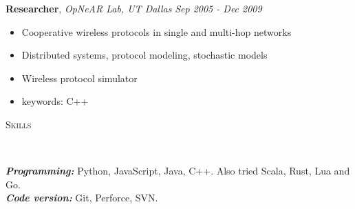 \documentclass[9pt]{article}
\newenvironment{changemargin}[2]{%
  \begin{list}{}{%
    \setlength{\topsep}{0pt}%
    \setlength{\leftmargin}{#1}%
    \setlength{\rightmargin}{#2}%
    \setlength{\listparindent}{\parindent}%
    \setlength{\itemindent}{\parindent}%
    \setlength{\parsep}{\parskip}%
  }%
  \item[]}{\end{list}
}
\newcommand{\lineover}{
	\begin{changemargin}{-0.05in}{-0.05in}
		\vspace*{-8pt}
		\hrulefill \\
		\vspace*{-2pt}
	\end{changemargin}
}
\newcommand{\header}[1]{
	\begin{changemargin}{-0.5in}{-0.5in}
		\scshape{#1}\\
  	\lineover
	\end{changemargin}
}
\newenvironment{body} {
	\vspace*{-16pt}
	\begin{changemargin}{-0.25in}{-0.5in}
  }
	{\end{changemargin}
}
\begin{document}
\begin{body}
  \textbf {Researcher}, \emph{OpNeAR Lab, UT Dallas} \hfill \emph{Sep 2005 - Dec 2009}\\
  \vspace*{-4pt}
  \begin{itemize} \itemsep -0pt
    \item Cooperative wireless protocols in single and multi-hop networks
    \item Distributed systems, protocol modeling, stochastic models
    \item Wireless protocol simulator
    \item keywords: C++
  \end{itemize}

\end{body}

\smallskip


\header{Skills}

\begin{body}
	\vspace{14pt}
	\emph{\textbf{Programming:}}{} Python, JavaScript, Java, C++. Also tried Scala, Rust, Lua and Go.\\
  \emph{\textbf{Code version:}}{} Git, Perforce, SVN.\\
\end{body}

\smallskip
\end{document}
